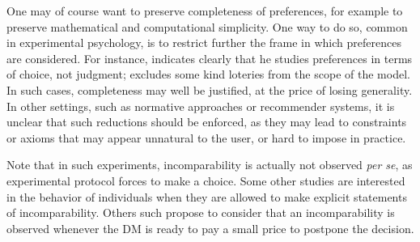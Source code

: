 \documentclass[french, english]{llncs}
\begin{document}
	One may of course want to preserve completeness of preferences, for example to preserve mathematical and computational simplicity. One way to do so, common in experimental psychology, is to restrict further the frame in which preferences are considered. For instance, \citet{luce_utility_2000} indicates clearly that he studies preferences in terms of choice, not judgment; \citet{maccrimmon_real_1980} excludes some kind loteries from the scope of the model. In such cases, completeness may well be justified, at the price of losing generality. In other settings, such as normative approaches or recommender systems, it is unclear that such reductions should be enforced, as they may lead to constraints or axioms that may appear unnatural to the user, or hard to impose in practice. 
	
	Note that in such experiments, incomparability is actually not observed \emph{per se}, as experimental protocol forces to make a choice. Some other studies \citet{deparis_when_2012} are interested in the behavior of individuals when they are allowed to make explicit statements of incomparability. Others such  \citet{danan_are_2006} propose to consider that an incomparability is observed whenever the \ac{DM} is ready to pay a small price to postpone the decision.


\end{document}
